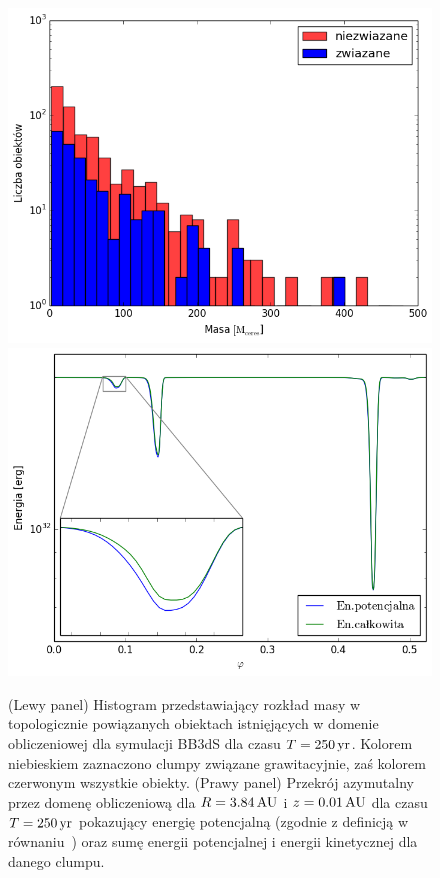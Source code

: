 \begin{figure}
   \centering
   \includegraphics[width=0.49\linewidth]{figures/masshist.png}
   \includegraphics[width=0.49\linewidth]{figures/energie.png}
   \caption{(Lewy panel) Histogram przedstawiający rozkład masy w topologicznie powiązanych
   obiektach istnięjących w domenie obliczeniowej dla symulacji BB3dS dla czasu
   $T=250\hbox{$\thinspace\textrm{yr}$}$. Kolorem niebieskiem zaznaczono clumpy związane grawitacyjnie, zaś
   kolorem czerwonym wszystkie obiekty.
   (Prawy panel) Przekrój azymutalny przez domenę obliczeniową dla $R=3.84\hbox{$\thinspace\textrm{AU}$}$
   i $z=0.01\hbox{$\thinspace\textrm{AU}$}$ dla czasu $T=250\hbox{$\thinspace\textrm{yr}$}$ pokazujący energię potencjalną (zgodnie z
   definicją w równaniu~) oraz sumę energii potencjalnej i energii
   kinetycznej dla danego clumpu.}
   \label{fig:masshist}
\end{figure}
%
